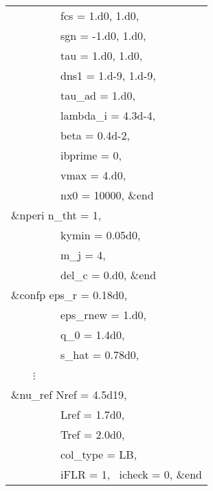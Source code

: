 \begin{table}[tb!]
\begin{tabular}{| l |}
  ~~~~~~~~~fcs = 1.d0, 1.d0,\\
  ~~~~~~~~~sgn = -1.d0, 1.d0,\\
  ~~~~~~~~~tau = 1.d0, 1.d0,\\
  ~~~~~~~~~dns1 = 1.d-9, 1.d-9,\\
  ~~~~~~~~~tau\_ad = 1.d0,\\
  ~~~~~~~~~lambda\_i = 4.3d-4,\\
  ~~~~~~~~~beta = 0.4d-2,\\
  ~~~~~~~~~ibprime = 0,\\
  ~~~~~~~~~vmax = 4.d0,\\
  ~~~~~~~~~nx0 = 10000, \&end\\
  \&nperi n\_tht = 1, \\
  ~~~~~~~~~kymin = 0.05d0,\\ 
  ~~~~~~~~~m\_j   = 4, \\
  ~~~~~~~~~del\_c = 0.d0, \&end\\
  \&confp eps\_r    = 0.18d0,\\
  ~~~~~~~~~eps\_rnew = 1.d0,\\
  ~~~~~~~~~q\_0      = 1.4d0,\\
  ~~~~~~~~~s\_hat    = 0.78d0,\\
  ~~~~$\vdots$\\
  \&nu\_ref Nref = 4.5d19,\\
  ~~~~~~~~~Lref = 1.7d0,\\
  ~~~~~~~~~Tref = 2.0d0,\\
  ~~~~~~~~~col\_type = LB,\\
  ~~~~~~~~~iFLR = 1, ~icheck = 0, \&end\\
  \hline
  \end{tabular}
\end{table}


